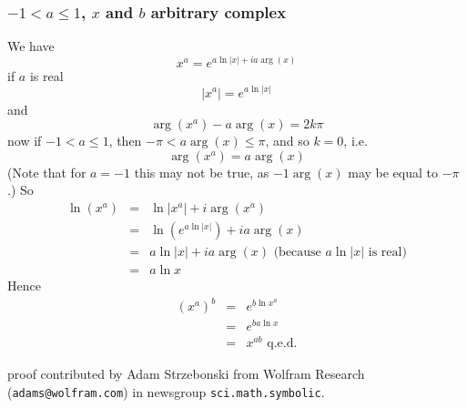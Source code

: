 \documentclass{article}
\begin{document}
\subsubsection{$-1 < a \le 1$, $x$ and $b$ arbitrary complex}

We have
\begin{equation}
x^a=e^{a \ln|x| + ia\arg(x)}
\end{equation}
if $a$ is real
\begin{equation}
|x^a|=e^{a\ln|x|}
\end{equation}
and
\begin{equation}
\arg(x^a)-a\arg(x)=2k\pi
\end{equation}
now if $-1 < a \le 1$, then $-\pi < a\arg(x) \le \pi$,
and so $k=0$, i.e.
\begin{equation}
\arg(x^a)=a\arg(x)
\end{equation}
(Note that for $a=-1$ this may not be true, as $-1 \arg(x)$ may be equal to $-\pi$.)
So
\begin{eqnarray}
\ln(x^a) & = & \ln|x^a| + i\arg(x^a)
\nonumber\\
& = & \ln (e^{a\ln|x|})+ia\arg(x)
\nonumber\\
& = & a \ln |x| + ia\arg(x) \mbox{ (because $a\ln|x|$ is real)}
\nonumber\\
& = & a\ln x
\end{eqnarray}
Hence
\begin{eqnarray}
(x^a)^b & = & e^{b\ln x^a}
\nonumber\\
& = & e^{ba\ln x}
\nonumber\\
& = & x^{ab} \mbox{ q.e.d.}
\end{eqnarray}

proof contributed by Adam Strzebonski from Wolfram Research
({\tt adams@wolfram.com}) in newsgroup {\tt sci.math.symbolic}.
\end{document}
